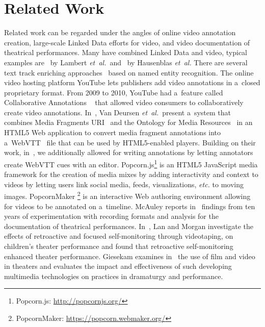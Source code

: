 \documentclass[runningheads,a4paper]{llncs}
\begin{document}
\section{Related Work}

Related work can be regarded under the angles
of online video annotation creation, large-scale Linked Data 
efforts for video, and video documentation of theatrical performances.
Many have combined Linked Data and video,
typical examples are~\cite{lambert2010linkeddata} by Lambert \emph{et~al.}\
and~\cite{hausenblas2009im} by Hausenblas \emph{et~al.}
There are several text track enriching approaches~\cite{li2013enriching,li2012creating,yi2012synote,steiner2010semwebvid}
based on named entity recognition.
The online video hosting platform YouTube
lets publishers add video annotations
in a~closed proprietary format.
From 2009 to 2010, YouTube had a~feature called
Collaborative Annotations%
~\cite{fink2009collaborativeannotations}
that allowed video consumers to collaboratively
create video annotations.
In~\cite{vandeursen2012mediafragmentannotations},
Van Deursen \emph{et~al.}\ present a~system
that combines Media Fragments URI~\cite{troncy2012mediafragments}
and the Ontology for Media Resources~\cite{lee2012mediaontology}
in an HTML5 Web application to convert
media fragment annotations into a~WebVTT~\cite{pfeiffer2013webvtt} file
that can be used by HTML5-enabled players.
Building on their work, in~\cite{steiner2014webvtt},
we additionally allowed for writing annotations by
letting annotators create WebVTT cues with an editor.
Popcorn.js\footnote{Popcorn.js: \url{http://popcornjs.org/}}
is an HTML5 JavaScript media framework
for the creation of media mixes
by adding interactivity and context to videos
by letting users link social media, feeds,
visualizations, \emph{etc.} to moving images.
PopcornMaker%
\footnote{PopcornMaker: \url{https://popcorn.webmaker.org/}}
is an interactive Web authoring environment
allowing for videos to be annotated on a~timeline.
McAuley reports in~\cite{mcauley1994video} findings from ten years of experimentation
with recording formats and analysis for the documentation of theatrical performances.
In~\cite{lan2003video}, Lan and Morgan investigate the effects of retroactive and
focused self-monitoring through videotaping, on children's theater performance
and found that retroactive self-monitoring enhanced theater performance.
Giesekam examines in~\cite{giesekam2007staging} the use of film and video in theaters
and evaluates the impact and effectiveness of such developing multimedia technologies on practices in dramaturgy and performance.
\end{document}
